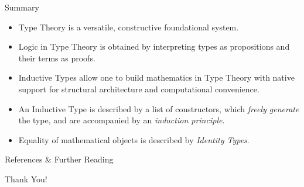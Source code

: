 \documentclass[10pt, aspectratio=169]{beamer}
\newcommand{\0}{\mathbf{0}}
\newcommand{\1}{\mathbf{1}}
\newcommand{\2}{\mathbf{2}}
\begin{document}
\begin{frame}{Summary}
\begin{itemize}
  \item Type Theory is a versatile, constructive foundational system.  
  \item Logic in Type Theory is obtained by interpreting types as propositions and their terms as proofs. 
  \item Inductive Types allow one to build mathematics in Type Theory with native support for structural architecture and computational convenience.
  \item An Inductive Type is described by a list of constructors, which \emph{freely generate} the type, and are accompanied by an \emph{induction principle}.
  \item Equality of mathematical objects is described by \emph{Identity Types}.
\end{itemize}
\end{frame}

\begin{frame}{References \& Further Reading}
\printbibliography
\nocite{*}
\end{frame}

\begin{frame}
    \begin{center}
        \Huge{Thank You!}
    \end{center}
\end{frame}
\end{document}
